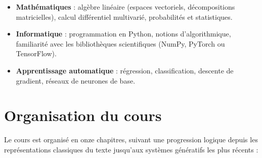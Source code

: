 \begin{itemize}
    \item \textbf{Math\'ematiques} : alg\`ebre lin\'eaire (espaces vectoriels,
          d\'ecompositions matricielles), calcul diff\'erentiel multivari\'e,
          probabilit\'es et statistiques.
    \item \textbf{Informatique} : programmation en Python, notions
          d'algorithmique, familiarit\'e avec les biblioth\`eques scientifiques
          (NumPy, PyTorch ou TensorFlow).
    \item \textbf{Apprentissage automatique} : r\'egression, classification,
          descente de gradient, r\'eseaux de neurones de base.
\end{itemize}

\section*{Organisation du cours}

Le cours est organis\'e en onze chapitres, suivant une progression logique
depuis les repr\'esentations classiques du texte jusqu'aux syst\`emes
g\'en\'eratifs les plus r\'ecents :

